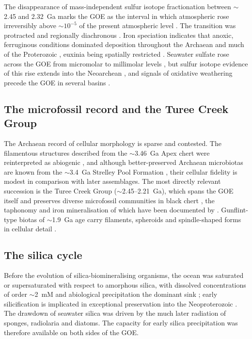 \documentclass[11pt]{article}
\begin{document}
The disappearance of mass-independent sulfur isotope fractionation between $\sim$2.45 and 2.32~Ga
marks the GOE as the interval in which atmospheric  rose irreversibly above $\sim$$10^{-5}$ of
the present atmospheric level \citep{Holland2006,Bekker2004,Pavlov2002,Farquhar2000}. The transition
was protracted and regionally diachronous \citep{Lyons2014,Philippot2018}. Iron speciation indicates
that anoxic, ferruginous conditions dominated deposition throughout the Archaean and much of the
Proterozoic \citep{Canfield1998,Poulton2005,Poulton2011}, euxinia being spatially restricted
\citep{Reinhard2009}. Seawater sulfate rose across the GOE from micromolar to millimolar levels
\citep{Habicht2002,Kah2004,Crowe2014}, but sulfur isotope evidence of this rise extends into the
Neoarchean \citep{Reinhard2009}, and signals of oxidative weathering precede the GOE in several
basins \citep{Anbar2007}.

\subsection{The microfossil record and the Turee Creek Group}

The Archaean record of cellular morphology is sparse and contested. The filamentous structures
described from the $\sim$3.46~Ga Apex chert \citep{Schopf1993} were reinterpreted as abiogenic
\citep{Brasier2002}, and although better-preserved Archaean microbiotas are known from the
$\sim$3.4~Ga Strelley Pool Formation \citep{Sugitani2010,Delarue2020}, their cellular fidelity is
modest in comparison with later assemblages. The most directly relevant succession is the Turee Creek
Group ($\sim$2.45--2.21~Ga), which spans the GOE itself and preserves diverse microfossil
communities in black chert \citep{Barlow2018}, the taphonomy and iron mineralisation of which have
been documented by \citet{Lepot2017TC}. Gunflint-type biotas of $\sim$1.9~Ga age carry filaments,
spheroids and spindle-shaped forms in cellular detail \citep{Lepot2017,Javaux2018}.

\subsection{The silica cycle}

Before the evolution of silica-biomineralising organisms, the ocean was saturated or supersaturated
with respect to amorphous silica, with dissolved concentrations of order $\sim$2~mM and abiological
precipitation the dominant sink \citep{Siever1992,Perry2007}; early silicification is implicated in
exceptional preservation into the Neoproterozoic \citep{Tarhan2016}. The drawdown of seawater silica
was driven by the much later radiation of sponges, radiolaria and diatoms. The capacity for early
silica precipitation was therefore available on both sides of the GOE.
\end{document}
